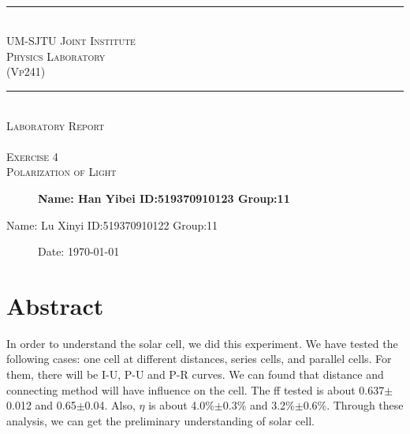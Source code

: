 \documentclass[12pt,a4paper]{article}
\begin{document}
\begin{center}
~\\
\rule[0mm]{400pt}{0.5pt}
\Large{ \textsc{\newline\\UM-SJTU Joint Institute\\Physics Laboratory\\(Vp241)\\}}
\rule[0mm]{400pt}{0.5pt}
\Large{ \textsc{\newline\newline\newline\newline\newline\newline\\
Laboratory Report\\}}
\Large{\textsc{ \\ Exercise 4  \\ Polarization of Light} }

\end{center}

\begin{description}
    \item[] 
    \item[] 
    \item[] 
    \item[] 
    \item[] 
    \item[]\qquad \qquad \textbf{Name: Han Yibei \qquad ID:519370910123   \qquad    Group:11}\\
    \item[\qquad \qquad Name: Lu Xinyi \qquad ID:519370910122   \qquad    Group:11\\] 
    \item[]\qquad \qquad Date: \today
\end{description}

\newpage


\section{Abstract}
In order to understand the solar cell, we did this experiment. We have tested the following cases: one cell at different distances, series cells, and parallel cells. For them, there will be I-U, P-U and P-R curves. We can found that distance and connecting method will have influence on the cell. The ff tested is about 0.637$\pm$0.012 and 0.65$\pm$0.04. Also, $\eta$ is about 4.0\%$\pm$0.3\% and 3.2\%$\pm$0.6\%. Through these analysis, we can get the preliminary understanding of solar cell.
\end{document}
